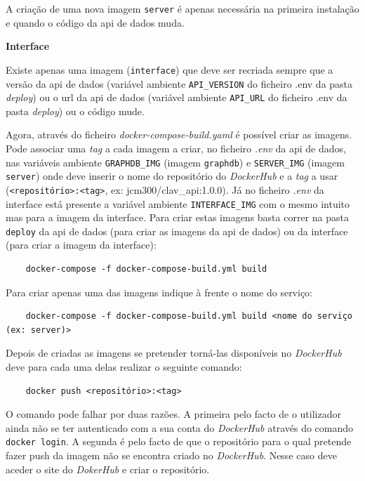 \begin{description}
    A criação de uma nova imagem \texttt{server} é apenas necessária na primeira instalação e quando o código da \acrshort{api} de dados muda.

    \item \textbf{Interface}

    Existe apenas uma imagem (\texttt{interface}) que deve ser recriada sempre que a versão da \acrshort{api} de dados (variável ambiente \texttt{API\_VERSION} do ficheiro .env da pasta \textit{deploy}) ou o \acrshort{url} da \acrshort{api} de dados (variável ambiente \texttt{API\_URL} do ficheiro .env da pasta \textit{deploy}) ou o código mude.
\end{description}

Agora, através do ficheiro \textit{docker-compose-build.yaml} é possível criar as imagens. Pode associar uma \textit{tag} a cada imagem a criar, no ficheiro \textit{.env} da \acrshort{api} de dados, nas variáveis ambiente \texttt{GRAPHDB\_IMG} (imagem \texttt{graphdb}) e \texttt{SERVER\_IMG} (imagem \texttt{server}) onde deve inserir o nome do repositório do \textit{DockerHub} e a \textit{tag} a usar (\verb|<repositório>:<tag>|, ex: jcm300/clav\_api:1.0.0). Já no ficheiro \textit{.env} da interface está presente a variável ambiente \texttt{INTERFACE\_IMG} com o mesmo intuito mas para a imagem da interface. Para criar estas imagens basta correr na pasta \texttt{deploy} da \acrshort{api} de dados (para criar as imagens da \acrshort{api} de dados) ou da interface (para criar a imagem da interface):

\begin{verbatim}
    docker-compose -f docker-compose-build.yml build
\end{verbatim}

Para criar apenas uma das imagens indique à frente o nome do serviço:
\begin{verbatim}
    docker-compose -f docker-compose-build.yml build <nome do serviço (ex: server)>
\end{verbatim}

Depois de criadas as imagens se pretender torná-las disponíveis no \textit{DockerHub} deve para cada uma delas realizar o seguinte comando:
\begin{verbatim}
    docker push <repositório>:<tag>
\end{verbatim}
O comando pode falhar por duas razões. A primeira pelo facto de o utilizador ainda não se ter autenticado com a sua conta do \textit{DockerHub} através do comando \verb|docker login|. A segunda é pelo facto de que o repositório para o qual pretende fazer push da imagem não se encontra criado no \textit{DockerHub}. Nesse caso deve aceder o site do \textit{DokerHub} e criar o repositório.


